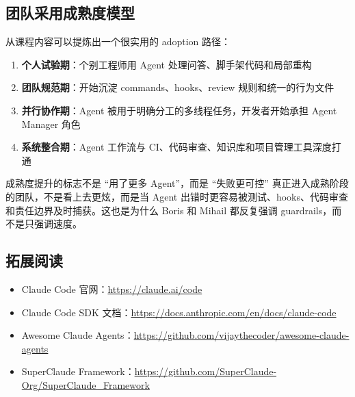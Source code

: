 \subsection{团队采用成熟度模型}

从课程内容可以提炼出一个很实用的 adoption 路径：

\begin{enumerate}
    \item \textbf{个人试验期}：个别工程师用 Agent 处理问答、脚手架代码和局部重构
    \item \textbf{团队规范期}：开始沉淀 commands、hooks、review 规则和统一的行为文件
    \item \textbf{并行协作期}：Agent 被用于明确分工的多线程任务，开发者开始承担 Agent Manager 角色
    \item \textbf{系统整合期}：Agent 工作流与 CI、代码审查、知识库和项目管理工具深度打通
\end{enumerate}

\begin{knowledgebox}{成熟度提升的标志不是 ``用了更多 Agent''，而是 ``失败更可控''}
真正进入成熟阶段的团队，不是看上去更炫，而是当 Agent 出错时更容易被测试、hooks、代码审查和责任边界及时捕获。这也是为什么 Boris 和 Mihail 都反复强调 guardrails，而不是只强调速度。
\end{knowledgebox}

\subsection{拓展阅读}

\begin{itemize}
    \item Claude Code 官网：\url{https://claude.ai/code}
    \item Claude Code SDK 文档：\url{https://docs.anthropic.com/en/docs/claude-code}
    \item Awesome Claude Agents：\url{https://github.com/vijaythecoder/awesome-claude-agents}
    \item SuperClaude Framework：\url{https://github.com/SuperClaude-Org/SuperClaude_Framework}
\end{itemize}




